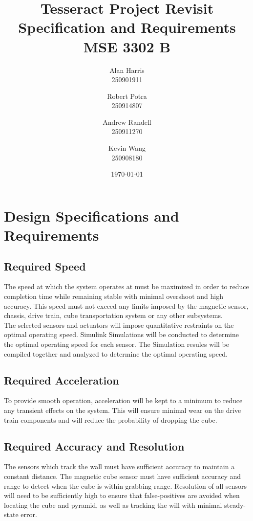 \documentclass[12pt]{article}
\begin{document}
\title{\textbf{Tesseract Project Revisit\\Specification and Requirements\\ MSE 3302 B}}
\author{
  Alan Harris\\
  250901911
  \and
  Robert Potra\\
  250914807
  \and
  Andrew Randell\\
  250911270
  \and
  Kevin Wang\\
  250908180
}
\date{\today}
\maketitle

\tableofcontents
\thispagestyle{empty}

\pagebreak
\setcounter{page}{1}
 
\section{Design Specifications and Requirements}
\subsection{Required Speed}
The speed at which the system operates at must be maximized in order to reduce completion time while remaining stable with minimal overshoot and high accuracy. This speed must not exceed any limits imposed by the magnetic sensor, chassis, drive train, cube transportation system or any other subsystems.  \\

The selected sensors and actuators will impose quantitative restraints on the optimal operating speed. Simulink Simulations will be conducted to determine the optimal operating speed for each sensor. The Simulation resules will be compiled together and analyzed to determine the optimal operating speed.

\subsection{Required Acceleration}
To provide smooth operation, acceleration will be kept to a minimum to reduce any transient effects on the system. This will ensure minimal wear on the drive train components and will reduce the probability of dropping the cube. 
\subsection{Required Accuracy and Resolution}
The sensors which track the wall must have sufficient accuracy to maintain a constant distance. The magnetic cube sensor must have sufficient accuracy and range to detect when the cube is within grabbing range. Resolution of all sensors will need to be sufficiently high to ensure that false-positives are avoided when locating the cube and pyramid, as well as tracking the will with minimal steady-state error.  
\end{document}
